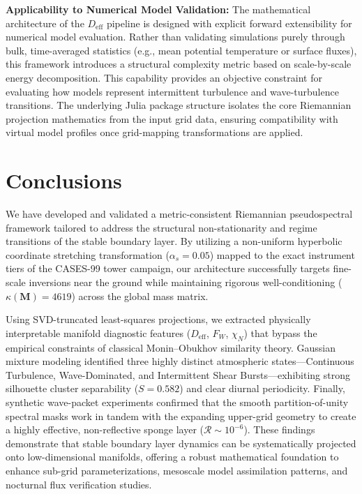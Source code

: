 \documentclass[11pt,a4paper]{article}
\begin{document}
\textbf{Applicability to Numerical Model Validation:}
The mathematical architecture of the $D_{\mathrm{eff}}$ pipeline is designed with explicit forward extensibility for numerical model evaluation. Rather than validating simulations purely through bulk, time-averaged statistics (e.g., mean potential temperature or surface fluxes), this framework introduces a structural complexity metric based on scale-by-scale energy decomposition. This capability provides an objective constraint for evaluating how models represent intermittent turbulence and wave-turbulence transitions. The underlying Julia package structure isolates the core Riemannian projection mathematics from the input grid data, ensuring compatibility with virtual model profiles once grid-mapping transformations are applied.

\section{Conclusions}
\label{sec:conclusions}
We have developed and validated a metric-consistent Riemannian pseudospectral framework tailored to address the structural non-stationarity and regime transitions of the stable boundary layer. By utilizing a non-uniform hyperbolic coordinate stretching transformation ($\alpha_s = 0.05$) mapped to the exact instrument tiers of the CASES-99 tower campaign, our architecture successfully targets fine-scale inversions near the ground while maintaining rigorous well-conditioning ($\kappa(\mathbf{M}) = 4619$) across the global mass matrix.

Using SVD-truncated least-squares projections, we extracted physically interpretable manifold diagnostic features ($D_{\mathrm{eff}}$, $F_W$, $\chi_N$) that bypass the empirical constraints of classical Monin--Obukhov similarity theory. Gaussian mixture modeling identified three highly distinct atmospheric states—Continuous Turbulence, Wave-Dominated, and Intermittent Shear Bursts—exhibiting strong silhouette cluster separability ($S = 0.582$) and clear diurnal periodicity. Finally, synthetic wave-packet experiments confirmed that the smooth partition-of-unity spectral masks work in tandem with the expanding upper-grid geometry to create a highly effective, non-reflective sponge layer ($\mathcal{R} \sim 10^{-6}$). These findings demonstrate that stable boundary layer dynamics can be systematically projected onto low-dimensional manifolds, offering a robust mathematical foundation to enhance sub-grid parameterizations, mesoscale model assimilation patterns, and nocturnal flux verification studies.



\end{document}
